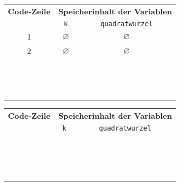 \begin{table}[htb]
\centering
\begin{minipage}{0.45\textwidth}
\begin{tabular}{ccc}
\toprule
\textbf{Code-Zeile} & \multicolumn{2}{c}{\textbf{Speicherinhalt der Variablen}} \\
			   & \lstinline[]$k$ & \lstinline[]$quadratwurzel$ \\
\midrule
1 & $\varnothing$ & $\varnothing$ \\ \hline
2 & $\varnothing$ & $\varnothing$ \\ \hline
& & \\ \hline
& & \\ \hline
& & \\ \hline
& & \\ \hline
& & \\ \hline
& & \\ \hline
& & \\ \hline
& & \\ \hline
& & \\ \hline
& & \\ \hline
& & \\ \hline
& & \\ \hline
& & \\ \hline
& & \\
\bottomrule
\end{tabular}
\end{minipage}
\hfill
\begin{minipage}{0.45\textwidth}
\begin{tabular}{ccc}
\toprule
\textbf{Code-Zeile} & \multicolumn{2}{c}{\textbf{Speicherinhalt der Variablen}} \\
			   & \lstinline[]$k$ & \lstinline[]$quadratwurzel$ \\
\midrule
& & \\ \hline
& & \\ \hline
& & \\ \hline
& & \\ \hline
& & \\ \hline
& & \\ \hline
& & \\ \hline
& & \\ \hline
& & \\ \hline
& & \\ \hline
& & \\ \hline
& & \\ \hline
& & \\ \hline
& & \\ \hline
& & \\ \hline
& & \\
\bottomrule
\end{tabular}
\end{minipage}
\end{table}


